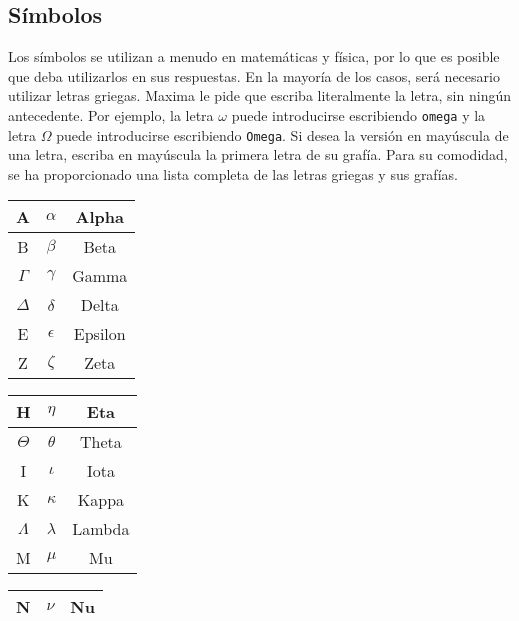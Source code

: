 \documentclass[a4paper]{article}
\newcommand{\stack}[1]{{\color{red}\tt #1}}
\begin{document}
\begin{multicols}{2}

\section*{Símbolos}
Los símbolos se utilizan a menudo en matemáticas y física, por lo que es posible que deba utilizarlos en sus respuestas. En la mayoría de los casos, será necesario utilizar letras griegas. Maxima le pide que escriba literalmente la letra, sin ningún antecedente. Por ejemplo, la letra $\omega$ puede introducirse escribiendo \stack{omega} y la letra $\Omega$ puede introducirse escribiendo \stack{Omega}. Si desea la versión en mayúscula de una letra, escriba en mayúscula la primera letra de su grafía. Para su comodidad, se ha proporcionado una lista completa de las letras griegas y sus grafías.
\begin{table}[H]
\begin{minipage}{0.22\linewidth}
\centering
\begin{tabular}{|c|c|c|} \hline
A & $\alpha$ & Alpha\\ \hline
B & $\beta$ & Beta\\ \hline
$\Gamma$ & $\gamma$ & Gamma \\ \hline
$\Delta$ & $\delta$ & Delta \\ \hline
E & $\epsilon$ & Epsilon \\ \hline
Z & $\zeta$ & Zeta \\ \hline
\end{tabular}
\end{minipage}
\hspace{0.2cm}
\begin{minipage}{0.22\linewidth}
\centering
\begin{tabular}{|c|c|c|} \hline
H & $\eta$ & Eta \\ \hline
$\Theta$ & $\theta$ & Theta \\ \hline
I & $\iota$ & Iota \\ \hline
K & $\kappa$ & Kappa \\ \hline
$\Lambda$ & $\lambda$ & Lambda \\ \hline
M & $\mu$ & Mu \\ \hline
\end{tabular}
\end{minipage}
\hspace{0.2cm}
\begin{minipage}{0.22\linewidth}
\centering
\begin{tabular}{|c|c|c|} \hline
N & $\nu$ & Nu \\ \hline

\end{tabular}
\end{minipage}
\end{table}
\end{multicols}
\end{document}
